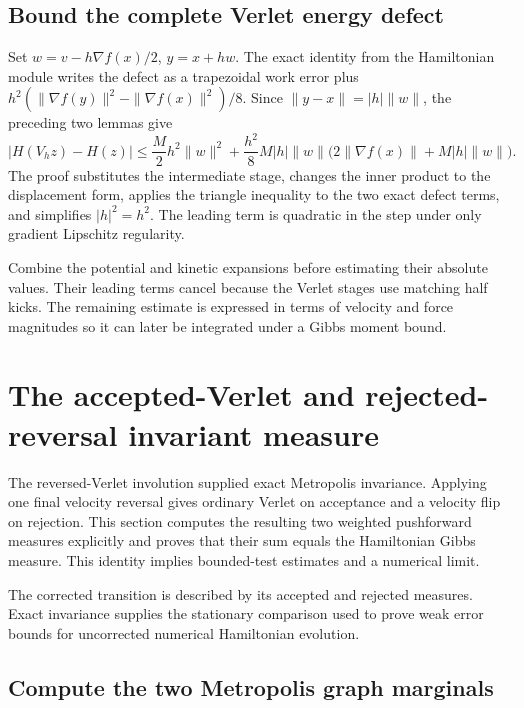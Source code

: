 \documentclass[11pt,a4paper]{report}
\begin{document}
\subsection{\texorpdfstring{Bound the complete Verlet energy defect}{Bound the complete Verlet energy defect}}
\label{report-step-KineticLangevin-HamiltonianError-lean-4}


Set \(w=v-h\nabla f(x)/2\), \(y=x+hw\). The exact identity from the Hamiltonian module writes the defect as a trapezoidal work error plus \(h^2(\|\nabla f(y)\|^2-\|\nabla f(x)\|^2)/8\). Since \(\|y-x\|=|h|\|w\|\), the preceding two lemmas give \[|H(V_hz)-H(z)|\le\frac M2h^2\|w\|^2+\frac{h^2}{8}M|h|\|w\|\bigl(2\|\nabla f(x)\|+M|h|\|w\|\bigr).\] The proof substitutes the intermediate stage, changes the inner product to the displacement form, applies the triangle inequality to the two exact defect terms, and simplifies \(|h|^2=h^2\). The leading term is quadratic in the step under only gradient Lipschitz regularity.



Combine the potential and kinetic expansions before estimating their absolute values. Their leading terms cancel because the Verlet stages use matching half kicks. The remaining estimate is expressed in terms of velocity and force magnitudes so it can later be integrated under a Gibbs moment bound.

\section{\texorpdfstring{The accepted-Verlet and rejected-reversal invariant measure}{The accepted-Verlet and rejected-reversal invariant measure}}
\label{proof-module-KineticLangevin-HamiltonianWeak-lean}


The reversed-Verlet involution supplied exact Metropolis invariance. Applying one final velocity reversal gives ordinary Verlet on acceptance and a velocity flip on rejection. This section computes the resulting two weighted pushforward measures explicitly and proves that their sum equals the Hamiltonian Gibbs measure. This identity implies bounded-test estimates and a numerical limit.



The corrected transition is described by its accepted and rejected measures. Exact invariance supplies the stationary comparison used to prove weak error bounds for uncorrected numerical Hamiltonian evolution.

\subsection{\texorpdfstring{Compute the two Metropolis graph marginals}{Compute the two Metropolis graph marginals}}
\label{report-step-KineticLangevin-HamiltonianWeak-lean-1}
\end{document}
